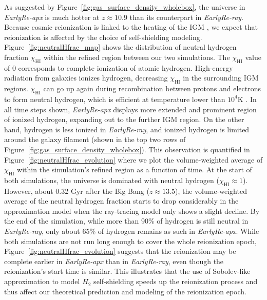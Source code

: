 \documentclass[linenumbers, twocolumn]{aastex631}
\begin{document}
As suggested by Figure~\ref{fig:gas_surface_density_wholebox}, the universe in \textit{EarlyRe-apx} is much hotter at $z \approx 10.9$ than its counterpart in \textit{EarlyRe-ray}. Because cosmic reionization is linked to the heating of the IGM \citep{DAloisio+2019}, we expect that reionization is affected by the choice of self-shielding modeling. Figure~\ref{fig:neutralHfrac_map} shows the distribution of neutral hydrogen fraction $\chi_{\mathrm{HI}}$ within the refined region between our two simulations. The $\chi_{\mathrm{HI}}$ value of 0 corresponds to complete ionization of atomic hydrogen. High-energy radiation from galaxies ionizes hydrogen, decreasing $\chi_{\mathrm{HI}}$ in the surrounding IGM regions. $\chi_{\mathrm{HI}}$ can go up again during recombination between protons and electrons to form neutral hydrogen, which is efficient at temperature lower than $10^{4} \mathrm{K}$ \citep{Wise+2019}. In all time steps shown, \textit{EarlyRe-apx} displays more extended and prominent region of ionized hydrogen, expanding out to the further IGM region. On the other hand, hydrogen is less ionized in \textit{EarlyRe-ray}, and ionized hydrogen is limited around the galaxy filament (shown in the top two rows of Figure~\ref{fig:gas_surface_density_wholebox}). This observation is quantified in Figure~\ref{fig:neutralHfrac_evolution} where we plot the volume-weighted average of $\chi_{\mathrm{HI}}$ within the simulation's refined region as a function of time. At the start of both simulations, the universe is dominated with neutral hydrogen ($\chi_{\mathrm{HI}} \approx 1$). However, about 0.32 Gyr after the Big Bang ($z \approx 13.5$), the volume-weighted average of the neutral hydrogen fraction starts to drop considerably in the approximation model when the ray-tracing model only shows a slight decline. By the end of the simulation, while more than 90\% of hydrogen is still neutral in \textit{EarlyRe-ray}, only about 65\% of hydrogen remains as such in \textit{EarlyRe-apx}. While both simulations are not run long enough to cover the whole reionization epoch, Figure~\ref{fig:neutralHfrac_evolution} suggests that the reionization may be complete earlier in \textit{EarlyRe-apx} than in \textit{EarlyRe-ray}, even though the reionization's start time is similar. This illustrates that the use of Sobolev-like approximation to model $H_{2}$ self-shielding speeds up the reionization process and thus affect our theoretical prediction and modeling of the reionization epoch. 
 

\end{document}
